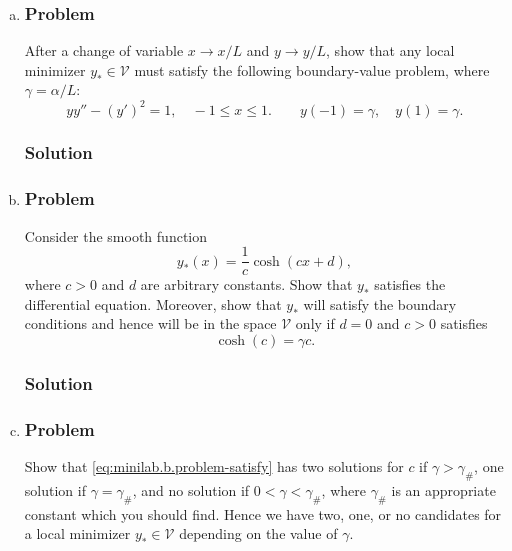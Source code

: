 \documentclass[12pt,twoside]{article}
\begin{document}
\begin{enumerate}[(a)]
\item
\subsubsection*{Problem}
After a change of variable $x\rightarrow x/L$ and $y\rightarrow y/L$, show that
any local minimizer $y_*\in \mathcal{V}$ must satisfy the following
boundary-value problem, where $\gamma=\alpha/L$:
\begin{equation}
  \label{eq:minilab.a-problem}
  yy''-{(y')}^2=1,\quad -1\le x\le1. \qquad y(-1)=\gamma,\quad y(1)=\gamma.
\end{equation}

\subsubsection*{Solution}
\todo{}

\item
\subsubsection*{Problem}
Consider the smooth function
\begin{equation}
  \label{eq:minilab.b-problem-smooth}
  y_*(x)=\frac{1}{c}\cosh(cx+d),
\end{equation}
where $c>0$ and $d$ are arbitrary constants. Show that $y_*$ satisfies the
differential equation. Moreover, show that $y_*$ will satisfy the boundary
conditions and hence will be in the space $\mathcal{V}$ only if $d=0$ and $c>0$
satisfies
\begin{equation}
  \label{eq:minilab.b.problem-satisfy}
  \cosh(c) = \gamma c.
\end{equation}

\subsubsection*{Solution}
\todo{}

\item
\subsubsection*{Problem}
Show that \cref{eq:minilab.b.problem-satisfy} has two solutions for $c$ if
$\gamma > \gamma_{\#}$, one solution if $\gamma = \gamma_{\#}$, and no solution
if $0<\gamma<\gamma_{\#}$, where $\gamma_{\#}$ is an appropriate constant which
you should find. Hence we have two, one, or no candidates for a local minimizer
$y_*\in\mathcal{V}$ depending on the value of $\gamma$.


\end{enumerate}
\end{document}

